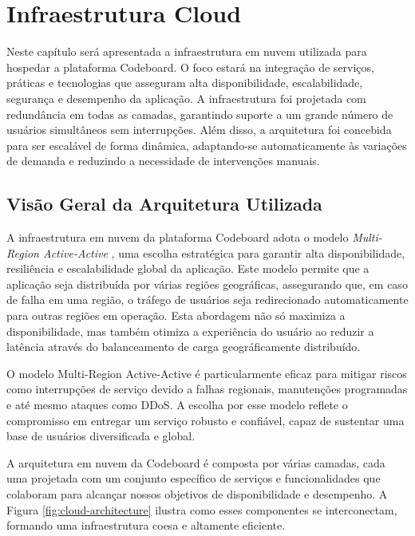 
\chapter{Infraestrutura Cloud}

Neste capítulo será apresentada a infraestrutura em nuvem utilizada para hospedar a plataforma Codeboard. O foco estará na integração de serviços, práticas e tecnologias que asseguram alta disponibilidade, escalabilidade, segurança e desempenho da aplicação. A infraestrutura foi projetada com redundância em todas as camadas, garantindo suporte a um grande número de usuários simultâneos sem interrupções. Além disso, a arquitetura foi concebida para ser escalável de forma dinâmica, adaptando-se automaticamente às variações de demanda e reduzindo a necessidade de intervenções manuais.

\section{Visão Geral da Arquitetura Utilizada}

A infraestrutura em nuvem da plataforma Codeboard adota o modelo \emph{Multi-Region Active-Active} \cite{multi-region-aa}, uma escolha estratégica para garantir alta disponibilidade, resiliência e escalabilidade global da aplicação. Este modelo permite que a aplicação seja distribuída por várias regiões geográficas, assegurando que, em caso de falha em uma região, o tráfego de usuários seja redirecionado automaticamente para outras regiões em operação. Esta abordagem não só maximiza a disponibilidade, mas também otimiza a experiência do usuário ao reduzir a latência através do balanceamento de carga geográficamente distribuído.

O modelo Multi-Region Active-Active é particularmente eficaz para mitigar riscos como interrupções de serviço devido a falhas regionais, manutenções programadas e até mesmo ataques como DDoS. A escolha por esse modelo reflete o compromisso em entregar um serviço robusto e confiável, capaz de sustentar uma base de usuários diversificada e global.

A arquitetura em nuvem da Codeboard é composta por várias camadas, cada uma projetada com um conjunto específico de serviços e funcionalidades que colaboram para alcançar nossos objetivos de disponibilidade e desempenho. A Figura \ref{fig:cloud-architecture} ilustra como esses componentes se interconectam, formando uma infraestrutura coesa e altamente eficiente. 

